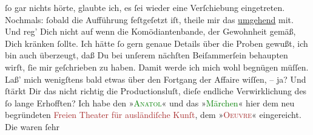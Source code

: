                ſo gar nichts hörte, glaubte ich, es ſei wieder eine Verſchiebung eingetreten.
               Nochmals: ſobald die Aufführung feſtgeſetzt iſt, theile mir das \uline{umgehend} mit. Und reg’ Dich nicht auf wenn die Komödiantenbande, der
               Gewohnheit gemäß, Dich kränken ſollte. Ich hätte ſo gern genaue Details über die
               Proben gewußt, ich bin auch überzeugt, daß Du bei unſerem nächſten {\pb}Beiſammerſein behaupten wirſt, ſie mir geſchrieben
               zu haben. Damit werde ich mich wohl begnügen müſſen.  Laß’ mich wenigſtens bald etwas über den Fortgang der Affaire wiſſen,
               – ja? Und ſtärkt Dir das nicht richtig die Productionsluſt, dieſe endliche
               Verwirklichung des ſo lange Erhofften?\pend
           \pstart
           Ich habe den »\textsc{\textcolor{green}{Anatol}{}\ledrightnote{\textcolor{green}{Anatol}}}« und das »\textcolor{green}{Märchen}{}\ledrightnote{\textcolor{green}{Das Märchen. Schauspiel in drei Aufzügen}}« hier dem neu
               begründeten \textcolor{brown}{Freien Theater für
                  ausländiſche Kunſt}{}, dem »\textsc{\textcolor{brown}{Oeuvre}{}\ledrightnote{\textcolor{brown}{Théâtre de l’Œuvre}}}« eingereicht. {\pb}Die \label{K_L02719-8v}\label{K_L02719-8h} waren ſehr
